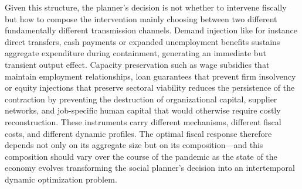 \documentclass[12pt, a4paper]{article}
\begin{document}
Given this structure, the planner's decision is not whether to intervene fiscally but how to compose the intervention mainly choosing between two different fundamentally different transmission channels. Demand injection like for instance direct transfers, cash payments or expanded unemployment benefits sustains aggregate expenditure during containment, generating an immediate but transient output effect. Capacity preservation such as wage subsidies that maintain employment relationships, loan guarantees that prevent firm insolvency or equity injections that preserve sectoral viability reduces the persistence of the contraction by preventing the destruction of organizational capital, supplier networks, and job-specific human capital that would otherwise require costly reconstruction. These instruments carry different mechanisms, different fiscal costs, and different dynamic profiles. The optimal fiscal
response therefore depends not only on its aggregate size but on its composition---and this composition should vary over the course of the pandemic as the state of the economy evolves transforming the social planner's decision into an intertemporal dynamic optimization problem.

\end{document}
